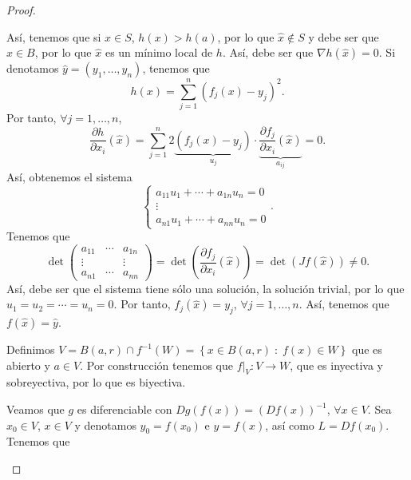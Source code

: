 \begin{proof}
\begin{description}
Así, tenemos que si $\displaystyle x \in S $, $\displaystyle h\left(x\right) > h\left(a\right) $, por lo que $\displaystyle \hat{x} \not\in S $ y debe ser que $\displaystyle \hat{x} \in B $, por lo que $\displaystyle \hat{x} $ es un mínimo local de $\displaystyle h $. Así, debe ser que $\displaystyle \nabla h\left(\hat{x}\right) = 0 $. Si denotamos $\displaystyle \hat{y} = \left(y_{1}, \ldots, y_{n}\right) $, tenemos que 
\[h\left(x\right) = \sum^{n}_{j = 1}\left(f_{j}\left(x\right)-y_{j}\right)^{2} .\]
Por tanto, $\displaystyle \forall j = 1, \ldots, n $,
\[\frac{\partial h}{\partial x_{i}}\left(\hat{x}\right) = \sum^{n}_{j = 1}2\underbrace{\left(f_{j}\left(x\right)-y_{j}\right)}_{u_{j}} \cdot \underbrace{\frac{\partial f_{j}}{\partial x_{i}}\left(\hat{ x}\right)}_{a_{ij}} = 0 .\]
Así, obtenemos el sistema
\[
\begin{cases}
a_{11}u_{1} + \cdots + a_{1n}u_{n} = 0 \\
\vdots \\
a_{n1}u_{1} + \cdots + a_{nn}u_{n} = 0
\end{cases}
.\]
Tenemos que 
\[\det\begin{pmatrix} a_{11} & \cdots & a_{1n} \\ \vdots & & \vdots \\ a_{n1} & \cdots & a_{nn} \end{pmatrix} = \det\left(\frac{\partial f_{j}}{\partial x_{i}}\left(\hat{x}\right)\right) = \det\left(Jf\left(\hat{x}\right)\right) \neq 0 .\]
Así, debe ser que el sistema tiene sólo una solución, la solución trivial, por lo que $\displaystyle u_{1} = u_{2} = \cdots = u_{n} = 0 $. Por tanto, $\displaystyle f_{j}\left(\hat{x}\right) = y_{j} $, $\displaystyle \forall j = 1, \ldots,n $. Así, tenemos que $\displaystyle f\left(\hat{x}\right) = \hat{y} $. 
\item[Paso 4.] Definimos $\displaystyle V = B\left(a,r\right) \cap f^{-1}\left(W\right) = \left\{ x \in B\left(a,r\right) \; : \; f\left(x\right) \in W\right\}  $ que es abierto y $\displaystyle a \in V $. Por construcción tenemos que $\displaystyle f|_{V} : V \to W $, que es inyectiva y sobreyectiva, por lo que es biyectiva. 
\item[Paso 5.] Veamos que $\displaystyle g $ es diferenciable con $\displaystyle Dg\left(f\left(x\right)\right) = \left(Df\left(x\right)\right)^{-1} $, $\displaystyle \forall x \in V $. Sea $\displaystyle x_{0} \in V $, $\displaystyle  x \in V $ y denotamos $\displaystyle y_{0} = f\left(x_{0}\right) $ e $\displaystyle y = f\left(x\right) $, así como $\displaystyle L = Df\left(x_{0}\right) $. Tenemos que 

\end{description}
\end{proof}

